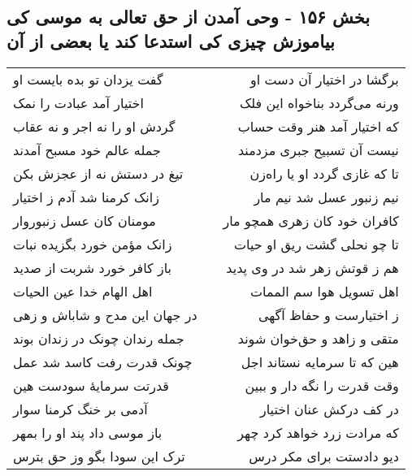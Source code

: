 \begin{center}
\section*{بخش ۱۵۶ - وحی آمدن از حق تعالی به موسی کی بیاموزش چیزی کی استدعا کند یا بعضی از آن}
\label{sec:sh156}
\begin{longtable}{l p{0.5cm} r}
گفت یزدان تو بده بایست او
&&
برگشا در اختیار آن دست او
\\
اختیار آمد عبادت را نمک
&&
ورنه می‌گردد بناخواه این فلک
\\
گردش او را نه اجر و نه عقاب
&&
که اختیار آمد هنر وقت حساب
\\
جمله عالم خود مسبح آمدند
&&
نیست آن تسبیح جبری مزدمند
\\
تیغ در دستش نه از عجزش بکن
&&
تا که غازی گردد او یا راه‌زن
\\
زانک کرمنا شد آدم ز اختیار
&&
نیم زنبور عسل شد نیم مار
\\
مومنان کان عسل زنبوروار
&&
کافران خود کان زهری همچو مار
\\
زانک مؤمن خورد بگزیده نبات
&&
تا چو نحلی گشت ریق او حیات
\\
باز کافر خورد شربت از صدید
&&
هم ز قوتش زهر شد در وی پدید
\\
اهل الهام خدا عین الحیات
&&
اهل تسویل هوا سم الممات
\\
در جهان این مدح و شاباش و زهی
&&
ز اختیارست و حفاظ آگهی
\\
جمله رندان چونک در زندان بوند
&&
متقی و زاهد و حق‌خوان شوند
\\
چونک قدرت رفت کاسد شد عمل
&&
هین که تا سرمایه نستاند اجل
\\
قدرتت سرمایهٔ سودست هین
&&
وقت قدرت را نگه دار و ببین
\\
آدمی بر خنگ کرمنا سوار
&&
در کف درکش عنان اختیار
\\
باز موسی داد پند او را بمهر
&&
که مرادت زرد خواهد کرد چهر
\\
ترک این سودا بگو وز حق بترس
&&
دیو دادستت برای مکر درس
\\
\end{longtable}
\end{center}
